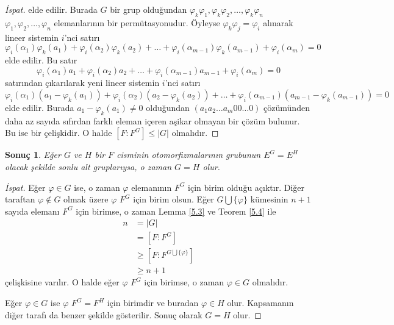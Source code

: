 \documentclass{article}
\newtheorem{cor}[thm]{Sonuç}
\theoremstyle{definition}
\theoremstyle{remark}
\newcommand{\envert}[1]{\left\lvert#1\right\rvert}
\let\abs=\envert
\begin{document}
\begin{proof}[İspat]
    	        elde edilir. Burada $G$ bir grup olduğundan $\varphi_k\varphi_1, \varphi_k\varphi_2, \dots, \varphi_k\varphi_n$ $\varphi_1, \varphi_2, \dots, \varphi_n$ elemanlarının bir permütasyonudur. Öyleyse $\varphi_k\varphi_j = \varphi_i$ alınarak lineer sistemin $i$'nci satırı
    	        \begin{equation*}
    	            \varphi_i(\alpha_1)\varphi_k(a_1) + \varphi_i(\alpha_2)\varphi_k(a_2) + \dots + \varphi_i(\alpha_{m - 1})\varphi_k(a_{m - 1}) + \varphi_i(\alpha_m) = 0
    	        \end{equation*}
    	        elde edilir. Bu satır
    	        \begin{equation*}
    	            \varphi_i(\alpha_1)a_1 + \varphi_i(\alpha_2)a_2 + \dots + \varphi_i(\alpha_{m - 1})a_{m - 1} + \varphi_i(\alpha_m) = 0
    	        \end{equation*}
    	        satırından çıkarılarak yeni lineer sistemin $i$'nci satırı
    	        \begin{equation*}
    	            \varphi_i(\alpha_1)(a_1 - \varphi_k(a_1)) + \varphi_i(\alpha_2)(a_2 - \varphi_k(a_2)) + \dots + \varphi_i(\alpha_{m - 1})(a_{m - 1} - \varphi_k(a_{m - 1})) = 0
    	        \end{equation*}
    	        elde edilir. Burada $a_1 - \varphi_k(a_1) \neq 0$ olduğundan $(a_1 a_2 \dots a_m 0 0 \dots 0)$ çözümünden daha az sayıda sıfırdan farklı eleman içeren aşikar olmayan bir çözüm bulunur. Bu ise bir çelişkidir. O halde $[F : F^G] \leq \abs{G}$ olmalıdır.
    	    \end{proof}
    		
    		\begin{cor}\label{5.5}
    		    Eğer $G$ ve $H$ bir $F$ cisminin otomorfizmalarının grubunun $E^G = E^H$ olacak şekilde sonlu alt gruplarıysa, o zaman $G = H$ olur.
    		\end{cor}
    		
    		\begin{proof}[İspat]
    	        Eğer $\varphi \in G$ ise, o zaman $\varphi$ elemanının $F^G$ için birim olduğu açıktır. Diğer taraftan $\varphi \notin G$ olmak üzere $\varphi$ $F^G$ için birim olsun. Eğer $G \bigcup \{\varphi\}$ kümesinin $n + 1$ sayıda elemanı $F^G$ için birimse, o zaman Lemma \ref{5.3} ve Teorem \ref{5.4} ile
    	        \begin{align*}
    	            n &= \abs{G}\\
    	            &= [F : F^G]\\
    	            &\geq [F : F^{G \bigcup \{\varphi\}}]\\
    	            &\geq n + 1
    	        \end{align*}
    	        çelişkisine varılır. O halde eğer $\varphi$ $F^G$ için birimse, o zaman $\varphi \in G$ olmalıdır.\par
    	        Eğer $\varphi \in G$ ise $\varphi$ $F^G = F^H$ için birimdir ve buradan $\varphi \in H$ olur. Kapsamanın diğer tarafı da benzer şekilde gösterilir. Sonuç olarak $G = H$ olur.
    	    \end{proof}
    		
\end{document}
